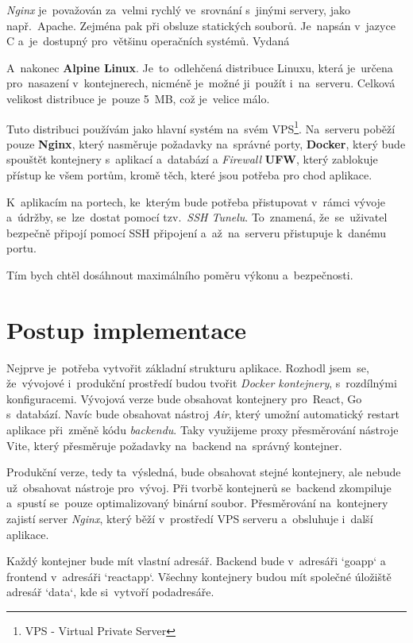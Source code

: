 \documentclass[14pt]{article}
\begin{document}
            \emph{Nginx} je~považován za~velmi rychlý ve~srovnání s~jinými servery, jako např.~Apache. Zejména pak při obsluze statických souborů.
            Je~napsán v~jazyce C a~je~dostupný pro~většinu operačních systémů. Vydaná  \parencite{WhatNGINX}

            A~nakonec \textbf{Alpine Linux}. Je~to~odlehčená distribuce Linuxu, která je~určena pro~nasazení v~kontejnerech,
            nicméně je~možné ji~použít i~na~serveru. Celková velikost distribuce je~pouze 5~MB, což je~velice málo.

            Tuto distribuci používám jako hlavní systém na~svém VPS\footnote{VPS - Virtual Private Server}.
            Na~serveru poběží pouze \textbf{Nginx}, který nasměruje požadavky na~správné porty,
            \textbf{Docker}, který bude spouštět kontejnery s~aplikací a~databází a \emph{Firewall} \textbf{UFW}, který zablokuje přístup ke všem portům,
            kromě těch, které jsou potřeba pro chod aplikace.

            K~aplikacím na portech, ke~kterým bude potřeba přistupovat v~rámci vývoje a~údržby, se~lze~dostat pomocí tzv.~\emph{SSH Tunelu}. To~znamená, že~se~uživatel bezpečně připojí pomocí SSH připojení a~až~na~serveru přistupuje k~danému portu.

            Tím bych chtěl dosáhnout maximálního poměru výkonu a~bezpečnosti.
	
	\section{Postup implementace}
        Nejprve je~potřeba vytvořit základní strukturu aplikace. Rozhodl jsem~se, že~vývojové i~produkční prostředí budou tvořit \emph{Docker kontejnery}, s~rozdílnými konfiguracemi.
        Vývojová verze bude obsahovat kontejnery pro~React, Go s~databází. Navíc bude obsahovat nástroj \emph{Air}, který umožní automatický restart aplikace při~změně kódu \emph{backendu}. Taky využijeme proxy přesměrování nástroje Vite, který přesměruje požadavky na~backend na~správný kontejner.

        Produkční verze, tedy ta~výsledná, bude obsahovat stejné kontejnery, ale nebude už~obsahovat nástroje pro~vývoj. Při tvorbě kontejnerů se~backend zkompiluje a~spustí se~pouze optimalizovaný binární soubor.
        Přesměrování na~kontejnery zajistí server \emph{Nginx}, který běží v~prostředí VPS serveru a~obsluhuje i~další aplikace.

        Každý kontejner bude mít vlastní adresář. Backend bude v~adresáři `goapp` a frontend v~adresáři `reactapp`. Všechny kontejnery budou mít společné úložiště adresář `data`, kde si~vytvoří podadresáře.
\end{document}

